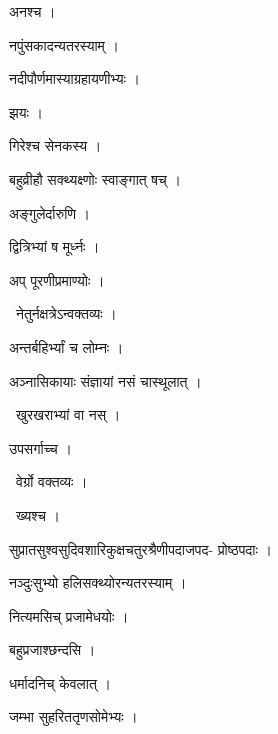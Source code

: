 \documentclass[10pt, openany, oneside]{book}
\begin{document}
\noindent अनश्च ।

\noindent नपुंसकादन्यतरस्याम् ।

\noindent नदीपौर्णमास्याग्रहायणीभ्यः ।

\noindent झयः ।

\noindent गिरेश्च सेनकस्य ।

\noindent बहुव्रीहौ सक्थ्यक्ष्णोः स्वाङ्गात् षच् ।

\noindent अङ्गुलेर्दारुणि ।

\noindent द्वित्रिभ्यां ष मूर्ध्नः ।

\noindent अप् पूरणीप्रमाण्योः ।

\par\noindent\hspace{1.5em}{\vps वा॰}~{\qt नेतुर्नक्षत्रेऽन्वक्तव्यः ।}

\noindent अन्तर्बहिर्भ्यां च लोम्नः ।

\noindent अञ्नासिकायाः संज्ञायां नसं चास्थूलात् ।

\par\noindent\hspace{1.5em}{\vps वा॰}~{\qt खुरखराभ्यां वा नस् ।}

\noindent उपसर्गाच्च ।

\par\noindent\hspace{1.5em}{\vps वा॰}~{\qt वेर्ग्रो वक्तव्यः ।}

\par\noindent\hspace{1.5em}{\vps वा॰}~{\qt ख्यश्च ।}

\noindent सुप्रातसुश्वसुदिवशारिकुक्षचतुरश्रैणीपदाजपद- प्रोष्ठपदाः ।

\noindent नञ्दुःसुभ्यो हलिसक्थ्योरन्यतरस्याम् ।

\noindent नित्यमसिच् प्रजामेधयोः ।

\noindent बहुप्रजाश्छन्दसि ।

\noindent धर्मादनिच् केवलात् ।

\noindent जम्भा सुहरिततृणसोमेभ्यः ।
\end{document}
